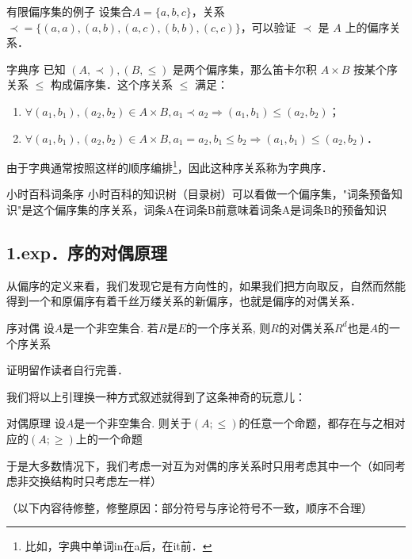 \begin{example}{有限偏序集的例子}
设集合$A = \{a,b,c\}$，关系$\prec\!= \{(a,a),(a,b),(a,c),(b,b),(c,c)\}$，可以验证 $\prec$ 是 $A$ 上的偏序关系．
\end{example}

\begin{example}{字典序}\label{OrdRel_ex1}
已知 $(A,\prec),(B,\leq)$ 是两个偏序集，那么笛卡尔积 $A\times B$ 按某个序关系 $\leqslant$ 构成偏序集．这个序关系 $\leqslant$ 满足：
\begin{enumerate}
\item $\forall(a_1,b_1),(a_2,b_2) \in A\times B, a_1\prec a_2 \Rightarrow (a_1,b_1)\leqslant(a_2,b_2)$；
\item $\forall(a_1,b_1),(a_2,b_2) \in A\times B, a_1=a_2, b_1\leq b_2 \Rightarrow (a_1,b_1) \leqslant (a_2, b_2)$．
\end{enumerate}

由于字典通常按照这样的顺序编排\footnote{比如，字典中单词in在a后，在it前．}，因此这种序关系称为字典序．
\end{example}

\begin{example}{小时百科词条序}
小时百科的知识树（目录树）可以看做一个偏序集，"词条预备知识"是这个偏序集的序关系，词条A在词条B前意味着词条A是词条B的预备知识
\end{example}

\subsection{1.exp．序的对偶原理}
从偏序的定义来看，我们发现它是有方向性的，如果我们把方向取反，自然而然能得到一个和原偏序有着千丝万缕关系的新偏序，也就是偏序的对偶关系．

\begin{lemma}{序对偶}
  设$A$是一个非空集合. 若$R$是$E$的一个序关系, 则$R$的对偶关系$R^{d}$也是$A$的一个序关系
\end{lemma}
证明留作读者自行完善．

我们将以上引理换一种方式叙述就得到了这条神奇的玩意儿：
\begin{theorem}{对偶原理}
 设$A$是一个非空集合. 则关于$(A;\leq)$的任意一个命题，都存在与之相对应的$(A;\geq)$上的一个命题
\end{theorem}

于是大多数情况下，我们考虑一对互为对偶的序关系时只用考虑其中一个（如同考虑非交换结构时只考虑左一样）

（以下内容待修整，修整原因：部分符号与序论符号不一致，顺序不合理）
